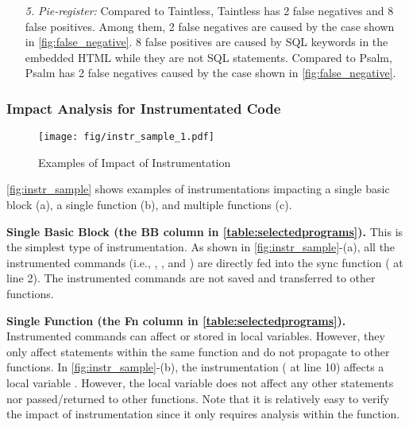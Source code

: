 \begin{itemize}[leftmargin=*]
    \item[\it 5.] {\it Pie-register:}
    Compared to Taintless, Taintless has 2 false negatives and 8 false positives. Among them, 2 false negatives are caused by the case shown in \autoref{fig:false_negative}. 8 false positives are caused by SQL keywords in the embedded HTML while they are not SQL statements.
    Compared to Psalm, Psalm has 2 false negatives caused by the case shown in \autoref{fig:false_negative}.



\end{itemize}









\subsubsection{Impact Analysis for Instrumentated Code}
\label{appendix:manual_analysis_instr_detail}

\begin{figure}[h]
    \centering
    \texttt{[image: fig/instr\_sample\_1.pdf]}
    \vspace{-1em}
     \caption{Examples of Impact of Instrumentation}
     \label{fig:instr_sample}
     \vspace{-1em}
\end{figure}

\autoref{fig:instr_sample} shows examples of instrumentations impacting a single basic block (a), a single function (b), and multiple functions (c).

\noindent
{\bf Single Basic Block (the BB column in \autoref{table:selectedprograms}).}
This is the simplest type of instrumentation. As shown in \autoref{fig:instr_sample}-(a), all the instrumented commands (i.e., , , and ) are directly fed into the sync function ( at line 2). The instrumented commands are not saved and transferred to other functions. %

\noindent
{\bf Single Function (the Fn column in \autoref{table:selectedprograms}).}
Instrumented commands can affect or stored in local variables. However, they only affect statements within the same function and do not propagate to other functions. 
In \autoref{fig:instr_sample}-(b), the instrumentation ( at line 10) affects a local variable . However, the local variable does not affect any other statements nor passed/returned to other functions.
Note that it is relatively easy to verify the impact of instrumentation since it only requires analysis within the function. %

